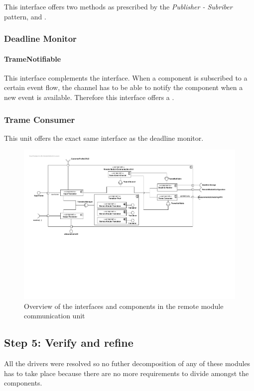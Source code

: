 \npar This interface offers two methods as prescribed by the \emph{Publisher -
Subriber} pattern,  and
.

\subsubsection{Deadline Monitor}

\paragraph{TrameNotifiable}

\npar This interface complements the  interface. When a
component is subscribed to a certain event flow, the channel has to be able to
notify the component when a new event is available. Therefore this interface
offers a .

\subsubsection{Trame Consumer}

\npar This unit offers the exact same interface as the deadline monitor.


\begin{figure}[H]
	\begin{centering}
		\includegraphics[width=\textwidth]{figs/add-it2-interfaces.pdf}
		\caption{Overview of the interfaces and components in the remote
		module communication unit}
		\label{fig:it2/interfaces}
	\end{centering}
\end{figure}

\subsection{Step 5: Verify and refine}
\label{add:it2/verification}

\npar All the drivers were resolved so no futher decomposition of any of these
modules has to take place because there are no more requirements to divide
amongst the components. 
